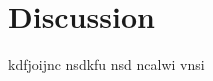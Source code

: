\documentclass[11ptm,oneside,a4paper]{report}
\begin{document}


 






\newpage


\section{Discussion}
kdfjoijnc nsdkfu nsd ncalwi vnsi 


\medskip



 
\end{document}
